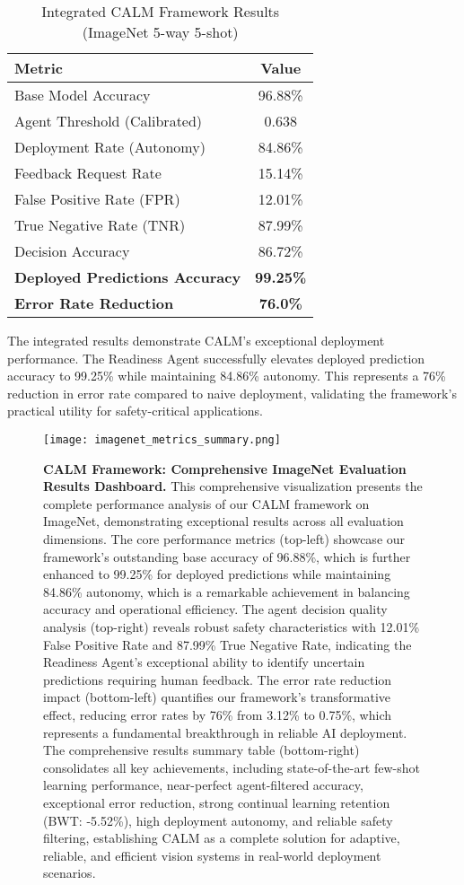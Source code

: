 \documentclass[conference]{IEEEtran}
\begin{document}
\begin{table}[h]
\centering
\caption{Integrated CALM Framework Results (ImageNet 5-way 5-shot)}
\label{tab:integrated}
\begin{tabular}{lc}
\toprule
\textbf{Metric} & \textbf{Value} \\
\midrule
Base Model Accuracy & 96.88\% \\
Agent Threshold (Calibrated) & 0.638 \\
Deployment Rate (Autonomy) & 84.86\% \\
Feedback Request Rate & 15.14\% \\
\midrule
False Positive Rate (FPR) & 12.01\% \\
True Negative Rate (TNR) & 87.99\% \\
Decision Accuracy & 86.72\% \\
\midrule
\textbf{Deployed Predictions Accuracy} & \textbf{99.25\%} \\
\textbf{Error Rate Reduction} & \textbf{76.0\%} \\
\bottomrule
\end{tabular}
\end{table}

The integrated results demonstrate CALM's exceptional deployment performance. The Readiness Agent successfully elevates deployed prediction accuracy to 99.25\% while maintaining 84.86\% autonomy. This represents a 76\% reduction in error rate compared to naive deployment, validating the framework's practical utility for safety-critical applications.

\begin{figure*}[!t]
\centering
\texttt{[image: imagenet\_metrics\_summary.png]}
\caption{\textbf{CALM Framework: Comprehensive ImageNet Evaluation Results Dashboard.} This comprehensive visualization presents the complete performance analysis of our CALM framework on ImageNet, demonstrating exceptional results across all evaluation dimensions. The core performance metrics (top-left) showcase our framework's outstanding base accuracy of 96.88\%, which is further enhanced to 99.25\% for deployed predictions while maintaining 84.86\% autonomy, which is a remarkable achievement in balancing accuracy and operational efficiency. The agent decision quality analysis (top-right) reveals robust safety characteristics with 12.01\% False Positive Rate and 87.99\% True Negative Rate, indicating the Readiness Agent's exceptional ability to identify uncertain predictions requiring human feedback. The error rate reduction impact (bottom-left) quantifies our framework's transformative effect, reducing error rates by 76\% from 3.12\% to 0.75\%, which represents a fundamental breakthrough in reliable AI deployment. The comprehensive results summary table (bottom-right) consolidates all key achievements, including state-of-the-art few-shot learning performance, near-perfect agent-filtered accuracy, exceptional error reduction, strong continual learning retention (BWT: -5.52\%), high deployment autonomy, and reliable safety filtering, establishing CALM as a complete solution for adaptive, reliable, and efficient vision systems in real-world deployment scenarios.}
\label{fig:results_dashboard}
\end{figure*}
\end{document}
